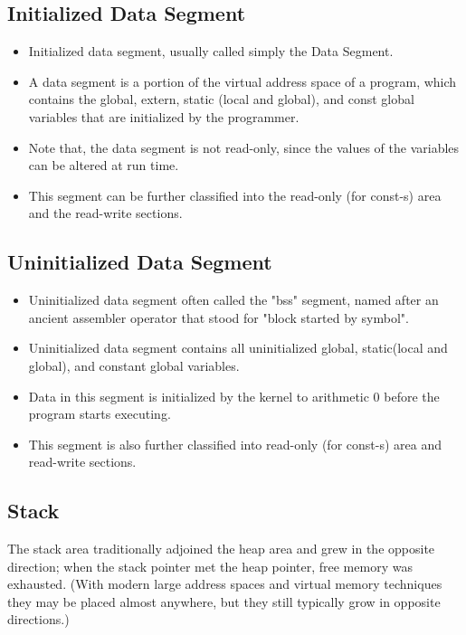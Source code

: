     \subsection{Initialized Data Segment}
    \begin{itemize}
        \item Initialized data segment, usually called simply the Data Segment. 
        \item A data segment is a portion of the virtual address space of a program, which contains the global, extern, static (local and global), and const global variables that are initialized by the programmer.
        \item Note that, the data segment is not read-only, since the values of the variables can be altered at run time.    
        \item This segment can be further classified into the read-only (for const-s) area and the read-write sections.
    \end{itemize}
    
    \subsection{Uninitialized Data Segment}
    \begin{itemize}
        \item Uninitialized data segment often called the "bss" segment, named after an ancient assembler operator that stood for "block started by symbol".
        \item Uninitialized data segment contains all uninitialized global, static(local and global), and constant global variables.
        \item Data in this segment is initialized by the kernel to arithmetic 0 before the program starts executing.    
        \item This segment is also further classified into read-only (for const-s) area and read-write sections.             
    \end{itemize}
    
    \subsection{Stack}
    The stack area traditionally adjoined the heap area and grew in the opposite direction; when the stack pointer met the heap pointer, free memory was exhausted. (With modern large address spaces and virtual memory techniques they may be placed almost anywhere, but they still typically grow in opposite directions.)

